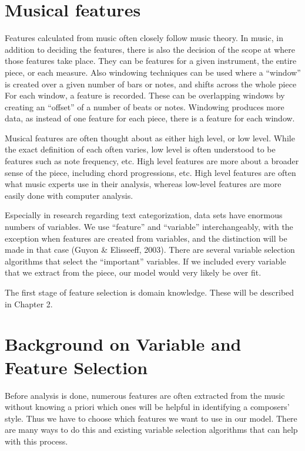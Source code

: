 \documentclass[12pt,twoside]{reedthesis}
\theoremstyle{definition}
\theoremstyle{definition}
\theoremstyle{definition}
\theoremstyle{remark}
\begin{document}
\section{Musical features}\label{musical-features}

Features calculated from music often closely follow music theory. In
music, in addition to deciding the features, there is also the decision
of the scope at where those features take place. They can be features
for a given instrument, the entire piece, or each measure. Also
windowing techniques can be used where a ``window'' is created over a
given number of bars or notes, and shifts across the whole piece For
each window, a feature is recorded. These can be overlapping windows by
creating an ``offset'' of a number of beats or notes. Windowing produces
more data, as instead of one feature for each piece, there is a feature
for each window.

Musical features are often thought about as either high level, or low
level. While the exact definition of each often varies, low level is
often understood to be features such as note frequency, etc. High level
features are more about a broader sense of the piece, including chord
progressions, etc. High level features are often what music experts use
in their analysis, whereas low-level features are more easily done with
computer analysis.

Especially in research regarding text categorization, data sets have
enormous numbers of variables. We use ``feature'' and ``variable''
interchangeably, with the exception when features are created from
variables, and the distinction will be made in that case (Guyon \&
Elisseeff, 2003). There are several variable selection algorithms that
select the ``important'' variables. If we included every variable that
we extract from the piece, our model would very likely be over fit.

The first stage of feature selection is domain knowledge. These will be
described in Chapter 2.

\section{Background on Variable and Feature
Selection}\label{background-on-variable-and-feature-selection}

Before analysis is done, numerous features are often extracted from the
music without knowing a priori which ones will be helpful in identifying
a composers' style. Thus we have to choose which features we want to use
in our model. There are many ways to do this and existing variable
selection algorithms that can help with this process.
\end{document}

